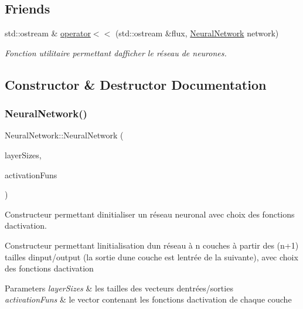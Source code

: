 \subsection*{Friends}
\begin{DoxyCompactItemize}
\item 
std\+::ostream \& \hyperlink{classNeuralNetwork_a0ecebf9a494437efb917804ed271e13f}{operator$<$$<$} (std\+::ostream \&flux, \hyperlink{classNeuralNetwork}{Neural\+Network} network)
\begin{DoxyCompactList}\small\item\em Fonction utilitaire permettant d\textquotesingle{}afficher le réseau de neurones. \end{DoxyCompactList}\end{DoxyCompactItemize}


\subsection{Constructor \& Destructor Documentation}
\mbox{\label{classNeuralNetwork_a85cd20f411e96dfd28954fcda39badb7}} 
\subsubsection{\texorpdfstring{Neural\+Network()}{NeuralNetwork()}\hspace{0.1cm}{\footnotesize\ttfamily [1/3]}}
{\footnotesize\ttfamily Neural\+Network\+::\+Neural\+Network (\begin{DoxyParamCaption}\item[{std\+::vector$<$ unsigned int $>$}]{layer\+Sizes,  }\item[{std\+::vector$<$ Functions\+::\+Activation\+Fun $>$}]{activation\+Funs }\end{DoxyParamCaption})}



Constructeur permettant d\textquotesingle{}initialiser un réseau neuronal avec choix des fonctions d\textquotesingle{}activation. 

Constructeur permettant l\textquotesingle{}initialisation d\textquotesingle{}un réseau à n couches à partir des (n+1) tailles d\textquotesingle{}input/output (la sortie d\textquotesingle{}une couche est l\textquotesingle{}entrée de la suivante), avec choix des fonctions d\textquotesingle{}activation 
\begin{DoxyParams}{Parameters}
{\em layer\+Sizes} & les tailles des vecteurs d\textquotesingle{}entrées/sorties \\
\hline
{\em activation\+Funs} & le vector contenant les fonctions d\textquotesingle{}activation de chaque couche \\
\hline
\end{DoxyParams}
\mbox{\label{classNeuralNetwork_ab4015471a72a3d00b6bcabf156526f7b}} 
